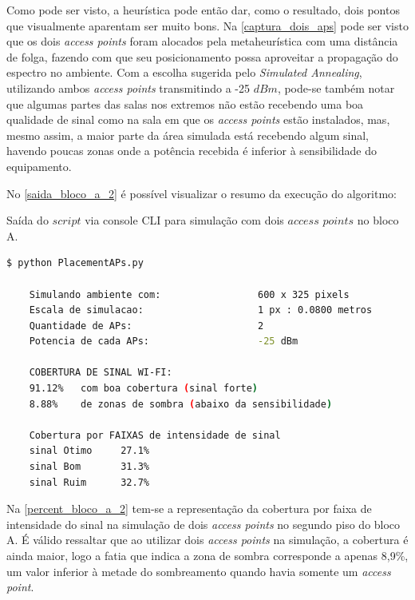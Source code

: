 \documentclass[
	12pt,				%
	twoside,			%
	a4paper,			%
	english,			%
	french,				%
	spanish,			%
	brazil				%
	]{abntex2}
\begin{document}
Como pode ser visto, a heurística pode então dar, como o resultado, dois
pontos que visualmente aparentam ser muito bons. Na
\autoref{captura_dois_aps} pode ser visto que os dois \emph{access
points} foram alocados pela metaheurística com uma distância de folga,
fazendo com que seu posicionamento possa aproveitar a propagação do
espectro no ambiente. Com a escolha sugerida pelo \emph{Simulated
Annealing}, utilizando ambos \emph{access points} transmitindo a -25
\(dBm\), pode-se também notar que algumas partes das salas nos extremos
não estão recebendo uma boa qualidade de sinal como na sala em que os
\emph{access points} estão instalados, mas, mesmo assim, a maior parte
da área simulada está recebendo algum sinal, havendo poucas zonas onde a
potência recebida é inferior à sensibilidade do equipamento.

No \autoref{saida_bloco_a_2} é possível visualizar o resumo da execução
do algoritmo:

\begin{quadro}[!htb]
    \caption{\label{saida_bloco_a_2} Saída do $script$ via console CLI para simulação com dois $access$ $points$ no bloco A. }

    \begin{lstlisting}[language=bash]
    $ python PlacementAPs.py 

    Simulando ambiente com:                 600 x 325 pixels
    Escala de simulacao:                    1 px : 0.0800 metros
    Quantidade de APs:                      2
    Potencia de cada APs:                   -25 dBm

    COBERTURA DE SINAL WI-FI:
    91.12%   com boa cobertura (sinal forte)
    8.88%    de zonas de sombra (abaixo da sensibilidade)

    Cobertura por FAIXAS de intensidade de sinal
    sinal Otimo     27.1%
    sinal Bom       31.3%
    sinal Ruim      32.7%
    \end{lstlisting}

\end{quadro}

Na \autoref{percent_bloco_a_2} tem-se a representação da cobertura por
faixa de intensidade do sinal na simulação de dois \emph{access points}
no segundo piso do bloco A. É válido ressaltar que ao utilizar dois
\emph{access points} na simulação, a cobertura é ainda maior, logo a
fatia que indica a zona de sombra corresponde a apenas 8,9\%, um valor
inferior à metade do sombreamento quando havia somente um \emph{access
point}.
\end{document}
